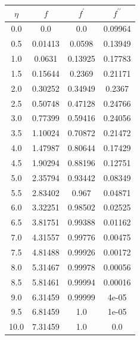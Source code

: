 \begin{table}
{\begin{tabular}{|c|c|c|c|}
            \hline
            $\eta$ & $f$ & $f^\prime$ & $f^{\prime\prime}$ \\ \hline
            0.0 & 0.0 & 0.0 & 0.09964 \\ \hline
            0.5 & 0.01413 & 0.0598 & 0.13949 \\ \hline
            1.0 & 0.0631 & 0.13925 & 0.17783 \\ \hline
            1.5 & 0.15644 & 0.2369 & 0.21171 \\ \hline
            2.0 & 0.30252 & 0.34949 & 0.2367 \\ \hline
            2.5 & 0.50748 & 0.47128 & 0.24766 \\ \hline
            3.0 & 0.77399 & 0.59416 & 0.24056 \\ \hline
            3.5 & 1.10024 & 0.70872 & 0.21472 \\ \hline
            4.0 & 1.47987 & 0.80644 & 0.17429 \\ \hline
            4.5 & 1.90294 & 0.88196 & 0.12751 \\ \hline
            5.0 & 2.35794 & 0.93442 & 0.08349 \\ \hline
            5.5 & 2.83402 & 0.967 & 0.04871 \\ \hline
            6.0 & 3.32251 & 0.98502 & 0.02525 \\ \hline
            6.5 & 3.81751 & 0.99388 & 0.01162 \\ \hline
            7.0 & 4.31557 & 0.99776 & 0.00475 \\ \hline
            7.5 & 4.81488 & 0.99926 & 0.00172 \\ \hline
            8.0 & 5.31467 & 0.99978 & 0.00056 \\ \hline
            8.5 & 5.81461 & 0.99994 & 0.00016 \\ \hline
            9.0 & 6.31459 & 0.99999 & 4e-05 \\ \hline
            9.5 & 6.81459 & 1.0 & 1e-05 \\ \hline
            10.0 & 7.31459 & 1.0 & 0.0 \\ \hline
        \end{tabular}
        \label{table_m2}
    }
\end{table}

